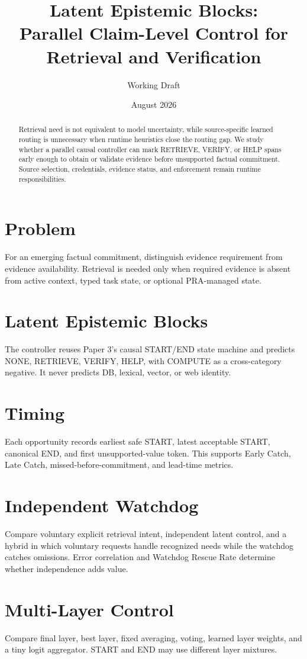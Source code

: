 \documentclass[10pt]{article}
\title{Latent Epistemic Blocks:\\Parallel Claim-Level Control for Retrieval and Verification}
\author{Working Draft}\date{August 2026}
\begin{document}
\maketitle
\begin{abstract}
Retrieval need is not equivalent to model uncertainty, while source-specific learned routing is unnecessary when runtime heuristics close the routing gap. We study whether a parallel causal controller can mark RETRIEVE, VERIFY, or HELP spans early enough to obtain or validate evidence before unsupported factual commitment. Source selection, credentials, evidence status, and enforcement remain runtime responsibilities.
\end{abstract}
\section{Problem}
For an emerging factual commitment, distinguish evidence requirement from evidence availability. Retrieval is needed only when required evidence is absent from active context, typed task state, or optional PRA-managed state.
\section{Latent Epistemic Blocks}
The controller reuses Paper 3's causal START/END state machine and predicts NONE, RETRIEVE, VERIFY, HELP, with COMPUTE as a cross-category negative. It never predicts DB, lexical, vector, or web identity.
\section{Timing}
Each opportunity records earliest safe START, latest acceptable START, canonical END, and first unsupported-value token. This supports Early Catch, Late Catch, missed-before-commitment, and lead-time metrics.
\section{Independent Watchdog}
Compare voluntary explicit retrieval intent, independent latent control, and a hybrid in which voluntary requests handle recognized needs while the watchdog catches omissions. Error correlation and Watchdog Rescue Rate determine whether independence adds value.
\section{Multi-Layer Control}
Compare final layer, best layer, fixed averaging, voting, learned layer weights, and a tiny logit aggregator. START and END may use different layer mixtures.
\end{document}
